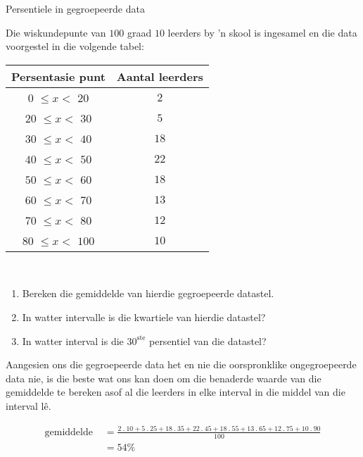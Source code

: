 \begin{wex}{Persentiele in gegroepeerde data}
{Die wiskundepunte van $100$ graad $10$ leerders by ’n skool is ingesamel en die data voorgestel in die volgende tabel:\\
    \begin{center}
      \begin{tabular}{|c|c|}  \hline
       
       \textbf{Persentasie punt} & \textbf{Aantal leerders} \\  \hline

         $0$  $ \leq x < $   $20$ &  $2$ \\ \hline
        $20$  $ \leq x < $   $30$ &  $5$ \\\hline
        $30$  $ \leq x < $   $40$ & $18$ \\\hline
        $40$  $ \leq x < $   $50$ & $22$ \\\hline
        $50$  $ \leq x < $   $60$ & $18$ \\\hline
        $60$  $ \leq x < $   $70$ & $13$ \\\hline
        $70$  $ \leq x < $   $80$ & $12$ \\\hline
        $80$  $ \leq x < $  $100$ & $10$ \\\hline
   
      \end{tabular}
    \end{center}
\vspace {8pt}\\
    \begin{enumerate}[noitemsep, label=\textbf{\arabic*}.]
    \item Bereken die gemiddelde van hierdie gegroepeerde datastel.
    \item In watter intervalle is die kwartiele van hierdie datastel?
    \item In watter interval is die $30^{\mathrm{ste}}$ persentiel van die datastel?
    \end{enumerate}
}{

  Aangesien ons die gegroepeerde data het en nie die oorspronklike ongegroepeerde data nie, is die beste wat ons kan doen om die benaderde waarde van die gemiddelde te bereken asof al die leerders in elke interval in die middel van die interval l\^e.

  \begin{align*}
 \mbox{gemiddelde } &=  \frac{
         2\:.\:10
      +  5\:.\:25
      + 18\:.\:35
      + 22\:.\:45
      + 18\:.\:55
      + 13\:.\:65
      + 12\:.\:75
      + 10\:.\:90
    }{100}\\
    &= 54\%
  \end{align*}

}
\end{wex}
